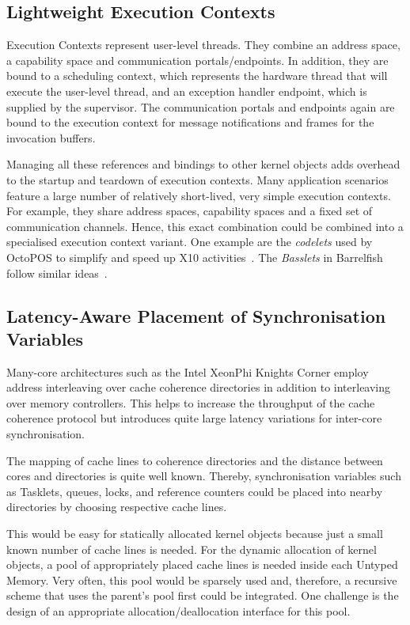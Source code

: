 \subsection{Lightweight Execution Contexts}
Execution Contexts represent user-level threads. They combine an address space, a capability space and communication portals/endpoints. In addition, they are bound to a scheduling context, which represents the hardware thread that will execute the user-level thread, and an exception handler endpoint, which is supplied by the supervisor. The communication portals and endpoints again are bound to the execution context for message notifications and frames for the invocation buffers.  

Managing all these references and bindings to other kernel objects adds overhead to the startup and teardown of execution contexts. Many application scenarios feature a large number of relatively short-lived, very simple execution contexts. For example, they share address spaces, capability spaces and a fixed set of communication channels. Hence, this exact combination could be combined into a specialised execution context variant. One example are the \emph{codelets} used by OctoPOS to simplify and speed up X10 activities~\cite{Mohr:2015:COM:2771774.2771775}. The \emph{Basslets} in Barrelfish follow similar ideas~\cite{DBLP:conf/damon/GicevaZAR16}.

\subsection{Latency-Aware Placement of Synchronisation Variables}
Many-core architectures such as the Intel XeonPhi Knights Corner employ address interleaving over cache coherence directories in addition to interleaving over memory controllers. This helps to increase the throughput of the cache coherence protocol but introduces quite large latency variations for inter-core synchronisation. 

The mapping of cache lines to coherence directories and the distance between cores and directories is quite well known. Thereby, synchronisation variables such as Tasklets, queues, locks, and reference counters could be placed into nearby directories by choosing respective cache lines. 

This would be easy for statically allocated kernel objects because just a small known number of cache lines is needed. For the dynamic allocation of kernel objects, a pool of appropriately placed cache lines is needed inside each Untyped Memory. Very often, this pool would be sparsely used and, therefore, a recursive scheme that uses the parent's pool first could be integrated. One challenge is the design of an appropriate allocation/deallocation interface for this pool.

